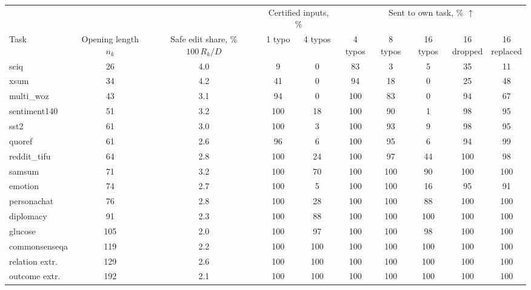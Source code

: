 \setlength{\tabcolsep}{3pt}%
\begin{tabular}{lccccccccc}
    \toprule
    & & & \multicolumn{2}{c}{Certified inputs, \%} & \multicolumn{5}{c}{Sent to own task, \% $\uparrow$} \\
    \cmidrule(lr){4-5} \cmidrule(lr){6-10}
    Task & \shortstack[c]{Opening\\length\\$n_k$} & \shortstack[c]{Safe edit\\share, \%\\$100\,R_k/D$} & 1 typo & 4 typos & 4 typos & 8 typos & 16 typos & \shortstack[c]{16\\dropped} & \shortstack[c]{16\\replaced} \\
    \midrule
    sciq & 26 & 4.0 & 9 & 0 & 83 & 3 & 5 & 35 & 11 \\
    xsum & 34 & 4.2 & 41 & 0 & 94 & 18 & 0 & 25 & 48 \\
    multi\_woz & 43 & 3.1 & 94 & 0 & 100 & 83 & 0 & 94 & 67 \\
    sentiment140 & 51 & 3.2 & 100 & 18 & 100 & 90 & 1 & 98 & 95 \\
    sst2 & 61 & 3.0 & 100 & 3 & 100 & 93 & 9 & 98 & 95 \\
    quoref & 61 & 2.6 & 96 & 6 & 100 & 95 & 6 & 94 & 99 \\
    reddit\_tifu & 64 & 2.8 & 100 & 24 & 100 & 97 & 44 & 100 & 98 \\
    samsum & 71 & 3.2 & 100 & 70 & 100 & 100 & 90 & 100 & 100 \\
    emotion & 74 & 2.7 & 100 & 5 & 100 & 100 & 16 & 95 & 91 \\
    personachat & 76 & 2.8 & 100 & 28 & 100 & 100 & 88 & 100 & 100 \\
    diplomacy & 91 & 2.3 & 100 & 88 & 100 & 100 & 100 & 100 & 100 \\
    glucose & 105 & 2.0 & 100 & 97 & 100 & 100 & 98 & 100 & 100 \\
    commonsenseqa & 119 & 2.2 & 100 & 100 & 100 & 100 & 100 & 100 & 100 \\
    relation extr. & 129 & 2.6 & 100 & 100 & 100 & 100 & 100 & 100 & 100 \\
    outcome extr. & 192 & 2.1 & 100 & 100 & 100 & 100 & 100 & 100 & 100 \\
    \bottomrule
\end{tabular}
